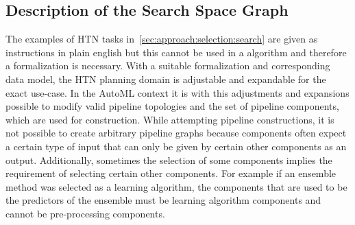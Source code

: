 \subsection{Description of the Search Space Graph}
\label{sec:approach:selection:graph}
The examples of HTN tasks in~\ref{sec:approach:selection:search} are given as instructions in plain english but this cannot be used in a algorithm and therefore a formalization is necessary.
With a suitable formalization and corresponding data model, the HTN planning domain is adjustable and expandable for the exact use-case.
In the AutoML context it is with this adjustments and expansions possible to modify valid pipeline topologies and the set of pipeline components, which are used for construction.\newline
While attempting pipeline constructions, it is not possible to create arbitrary pipeline graphs because components often expect a certain type of input that can only be given by certain other components as an output.
Additionally, sometimes the selection of some components implies the requirement of selecting certain other components.
For example if an ensemble method was selected as a learning algorithm, the components that are used to be the predictors of the ensemble must be learning algorithm components and cannot be pre-processing components.

